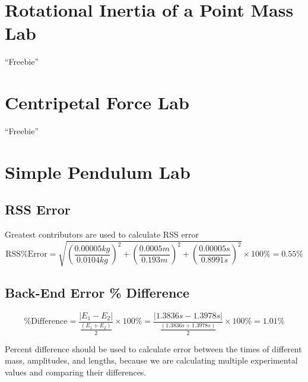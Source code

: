 \chapter*{\centering Rotational Inertia of a Point Mass Lab}
\begin{center}
  \Huge ``Freebie''
\end{center}

\chapter*{\centering Centripetal Force Lab}
\begin{center}
  \Huge ``Freebie''
\end{center}


\chapter*{Simple Pendulum Lab}

\section*{RSS Error}

\begin{center}
  \noindent Greatest contributors are used to calculate RSS error
  \begin{equation*}
      \text{RSS\% Error} = \sqrt{ \left( \frac{0.00005kg}{0.0104kg} \right)^2 
      + \left( \frac{0.0005 m}{0.193 m} \right)^2 + \left( \frac{0.00005 s}{0.8991 s} \right)^2}
      \times 100\% = 0.55\%
  \end{equation*}
\end{center}

\section*{Back-End Error \% Difference}

\begin{center}
  \begin{equation*}
    \text{\% Difference} = \frac{|E_1 - E_2|}{\frac{(E_1 + E_2)}{2}} \times 100\% 
    = \frac{|1.3836 s - 1.3978 s|}{\frac{(1.3836 s + 1.3978 s)}{2}} \times 100\% = 1.01\%
  \end{equation*}
\end{center}

\noindent Percent difference should be used to calculate error between the times of different mass, amplitudes, and lengths, 
because we are calculating multiple experimental values and comparing their differences. 

